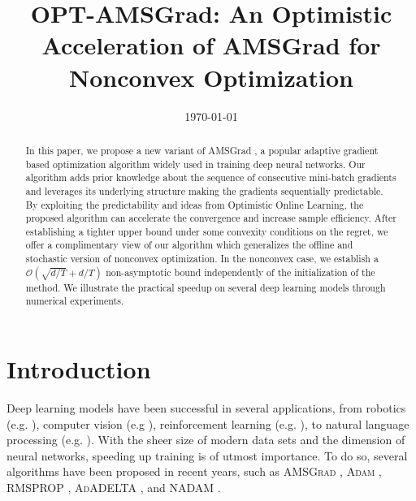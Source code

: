 \documentclass[11pt]{article}
\theoremstyle{k}
\begin{document}
\title{OPT-AMSGrad: An Optimistic Acceleration of AMSGrad for Nonconvex Optimization}
\date{\today}

\maketitle


\begin{abstract}
In this paper, we propose a new variant of AMSGrad \citep{RKK18}, a popular adaptive gradient based optimization algorithm widely used in training deep neural networks. 
Our algorithm adds prior knowledge about the sequence of consecutive mini-batch gradients and leverages its underlying structure making the gradients sequentially predictable. 
By exploiting the predictability and ideas from Optimistic Online Learning, the proposed algorithm can accelerate the convergence and increase sample efficiency.
After establishing a tighter upper bound under some convexity conditions on the regret, we offer a complimentary view of our algorithm which generalizes the offline and stochastic version of nonconvex optimization. 
In the nonconvex case, we establish a $\mathcal{O}(\sqrt{d/T} +d/T )$ non-asymptotic bound independently of the initialization of the method.
We illustrate the practical speedup on several deep learning models through numerical experiments.
\end{abstract}

\section{Introduction}

Deep learning models have been successful in several applications, from robotics (e.g. \citep{LFDA17}), computer vision (e.g \citep{Rnet16,goodfellow2014generative}), reinforcement learning (e.g. \citep{Atari13}), to natural language processing (e.g. \citep{GMH13}).
With the sheer size of modern data sets and the dimension of neural networks, speeding up training is of utmost importance.
To do so, several algorithms have been proposed in recent years, such as  \textsc{AMSGrad} \citep{RKK18}, \textsc{Adam} \citep{KB15}, \textsc{RMSPROP} \citep{TH12}, \textsc{AdADELTA} \citep{Z12}, and \textsc{NADAM} \citep{D16}.
\end{document}
